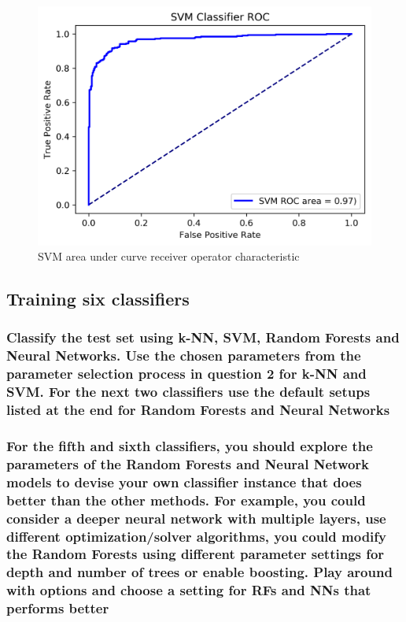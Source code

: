 \begin{figure}[!ht]
 \centering
\includegraphics[width=6.1in]{assignment2/2-2-b-svm.png}
\caption{\label{fig:svmtuning} SVM area under curve receiver operator characteristic}
\end{figure}


\subsection{Training six classifiers}

\subsubsection{Classify the test set using k-NN, SVM, Random Forests and Neural Networks. Use the chosen parameters from the parameter selection process in question 2 for k-NN and SVM. For the next two classifiers use the default setups listed at the end for Random Forests and Neural Networks}


\subsubsection{For the fifth and sixth classifiers, you should explore the parameters of the Random Forests and Neural Network models to devise your own classifier instance that does better than the other methods. For example, you could consider a deeper neural network with multiple layers, use different optimization/solver algorithms, you could modify the Random Forests using different parameter settings for depth and number of trees or enable boosting. Play around with options and choose a setting for RFs and NNs that performs better}


